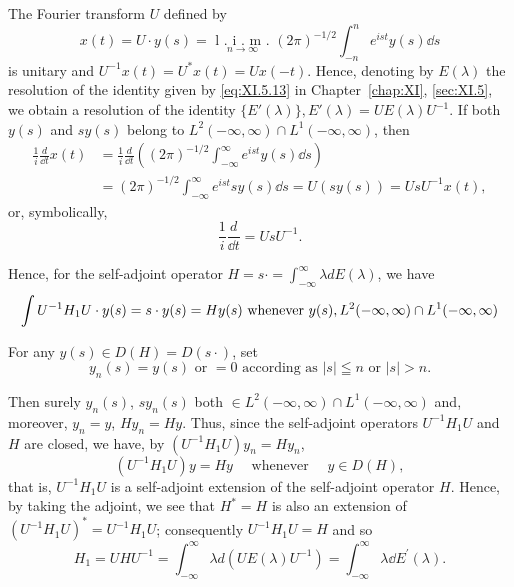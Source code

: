 The Fourier transform $U$ defined by 
\[
x (t) = U \cdot y (s) = \underset {n \rightarrow \infty} {\text{ l . i . m . }} (2 \pi) ^{-1/2} \int_{-n} ^{n} e ^{ist} y (s) \dd s
\]
is unitary and $U^{-1}x(t) = U^{*}x(t) = Ux(-t)$. Hence, denoting by $E(\lambda)$ the resolution of the identity given by \eqref{eq:XI.5.13} in Chapter~\ref{chap:XI}, \ref{sec:XI.5}, we obtain a resolution of the identity $\{E'(\lambda)\}, E'(\lambda) = UE(\lambda)U^{-1}$. If both $y(s)$ and $sy(s)$ belong to $L^2(-\infty, \infty) \cap L^1(-\infty, \infty)$, then 
\[
\begin{aligned}
\frac {1}{i} \frac {d}{\dd t} x (t) &= \frac {1}{i} \frac {d}{\dd t} \left((2 \pi) ^{-1/2} \int_{- \infty} ^{\infty} e ^{ist} y (s) \dd s\right)
\\
&= (2 \pi) ^{-1/2} \int_{- \infty} ^{\infty} e ^{ist} s y (s) \dd s = U (s y (s)) = U s U ^{-1} x (t),
\end{aligned}
\]
or, symbolically, 
\begin{equation}\label{eq:XI.6.1}
\frac {1}{i} \frac {d}{\dd t} = U s U ^{-1}.
\end{equation}

Hence, for the self-adjoint operator $H = s \cdot = \int_{-\infty}^{\infty} \lambda dE(\lambda)$, we have 
\begin{equation}\int U ^{-1} H _{1} U \cdot y (s) = s \cdot y (s) = H y (s) \text{ whenever } y (s), L ^{2} (- \infty , \infty) \cap L ^{1} (- \infty , \infty) \notag\end{equation}

For any $y(s) \in D(H) = D(s \cdot)$, set 
\[
y _{n} (s) = y (s) \text{ or } = 0 \text{ according as } | s | \leqq n \text{ or } | s | > n.
\]

Then surely $y_{n}(s)$, $s y_{n}(s)$ both $\in L^{2}(-\infty, \infty) \cap L^{1}(-\infty, \infty)$ and, moreover, \slim $y_{n} = y$, \slim $H y_{n} = H y$. Thus, since the self-adjoint operators $U^{-1}H_{1}U$ and $H$ are closed, we have, by $(U^{-1}H_{1}U)y_{n} = Hy_{n}$, 
\[
\left(U ^{-1} H _{1} U\right) y = H y \quad \text{ whenever } \quad y \in D (H),
\]
that is, $U^{-1}H_{1}U$ is a self-adjoint extension of the self-adjoint operator $H$. Hence, by taking the adjoint, we see that $H^{*}=H$ is also an extension of $(U^{-1}H_{1}U)^{*}=U^{-1}H_{1}U$; consequently $U^{-1}H_{1}U=H$ and so 
\[
H _{1} = U H U ^{-1} = \int_{- \infty} ^{\infty} \lambda d (U E (\lambda) U ^{-1}) = \int_{- \infty} ^{\infty} \lambda \dd E ^{\prime} (\lambda).
\]


\label{sec:XI.7}

